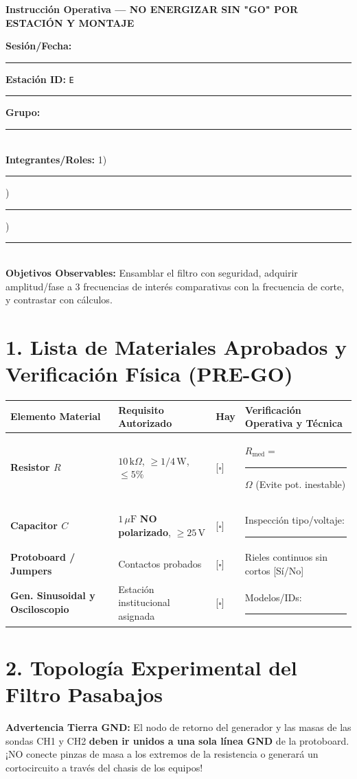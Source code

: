 \documentclass[11pt, a4paper]{article}
\begin{document}
\begin{tcolorbox}[colback=warnred!5!white, colframe=warnred, title=\textbf{Artefacto A3: Guía Experimental Integral EC4 (Filtro RC Pasabajos AC)}]
    \centering \textbf{Instrucción Operativa — NO ENERGIZAR SIN "GO" POR ESTACIÓN Y MONTAJE}
\end{tcolorbox}

\noindent\textbf{Sesión/Fecha:} \rule{4cm}{0.4pt} \quad \textbf{Estación ID:} \texttt{E}\rule{2cm}{0.4pt} \quad \textbf{Grupo:} \rule{2cm}{0.4pt} \\
\textbf{Integrantes/Roles:} 1) \rule{3.5cm}{0.4pt} ) \rule{3.5cm}{0.4pt} ) \rule{3.5cm}{0.4pt} \\
\textbf{Objetivos Observables:} Ensamblar el filtro con seguridad, adquirir amplitud/fase a 3 frecuencias de interés comparativas con la frecuencia de corte, y contrastar con cálculos.

\section*{1. Lista de Materiales Aprobados y Verificación Física (PRE-GO)}
\renewcommand{\arraystretch}{1.5}
\noindent
\begin{tabularx}{\textwidth}{>{\bfseries\RaggedRight\hsize=1.0\hsize}X >{\RaggedRight\arraybackslash\hsize=0.8\hsize}X >{\centering\arraybackslash\hsize=0.4\hsize}X >{\RaggedRight\arraybackslash\hsize=1.8\hsize}X}
\toprule
\textbf{Elemento Material} & \textbf{Requisito Autorizado} & \textbf{Hay} & \textbf{Verificación Operativa y Técnica} \\
\midrule
Resistor $R$ & $10\,\text{k}\Omega$, $\ge 1/4\,\text{W}$, $\le 5\%$ & {[$\square$]} & $R_{\text{med}} = $ \rule{2.5cm}{0.4pt} $\Omega$ (Evite pot. inestable) \\ \addlinespace
Capacitor $C$ & $1\,\mu\text{F}$ \textbf{NO polarizado}, $\ge 25\,\text{V}$ & {[$\square$]} & Inspección tipo/voltaje: \rule{4cm}{0.4pt} \\ \addlinespace
Protoboard / Jumpers & Contactos probados & {[$\square$]} & Rieles continuos sin cortos [Sí/No] \\ \addlinespace
Gen. Sinusoidal y Osciloscopio & Estación institucional asignada & {[$\square$]} & Modelos/IDs: \rule{5.5cm}{0.4pt} \\
\bottomrule
\end{tabularx}

\section*{2. Topología Experimental del Filtro Pasabajos}
\textbf{Advertencia Tierra GND:} El nodo de retorno del generador y las masas de las sondas CH1 y CH2 \textbf{deben ir unidos a una sola línea GND} de la protoboard. ¡NO conecte pinzas de masa a los extremos de la resistencia o generará un cortocircuito a través del chasis de los equipos!
\end{document}
